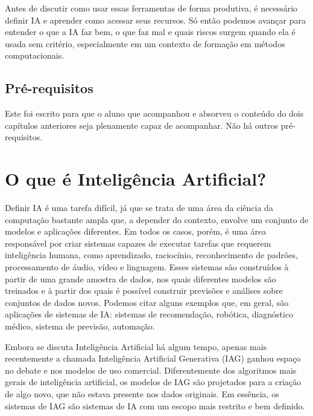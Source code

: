 \documentclass[
  brazilian,
  letterpaper,
  DIV=11,
  numbers=noendperiod]{scrreprt}
\begin{document}
Antes de discutir como usar essas ferramentas de forma produtiva, é
necessário definir IA e aprender como acessar seus recursos. Só então
podemos avançar para entender o que a IA faz bem, o que faz mal e quais
riscos surgem quando ela é usada sem critério, especialmente em um
contexto de formação em métodos computacionais.

\subsection{Pré-requisitos}\label{pruxe9-requisitos-2}

Este foi escrito para que o aluno que acompanhou e absorveu o conteúdo
do dois capítulos anteriores seja plenamente capaz de acompanhar. Não há
outros pré-requisitos.

\section{O que é Inteligência
Artificial?}\label{o-que-uxe9-inteliguxeancia-artificial}

Definir IA é uma tarefa difícil, já que se trata de uma área da ciência
da computação bastante ampla que, a depender do contexto, envolve um
conjunto de modelos e aplicações diferentes. Em todos os casos, porém, é
uma área responsável por criar sistemas capazes de executar tarefas que
requerem inteligência humana, como aprendizado, raciocínio,
reconhecimento de padrões, processamento de áudio, vídeo e linguagem.
Esses sistemas são construídos à partir de uma grande amostra de dados,
nos quais diferentes modelos são treinados e à partir dos quais é
possível construir previsões e análises sobre conjuntos de dados novos.
Podemos citar alguns exemplos que, em geral, são aplicações de sistemas
de IA: sistemas de recomendação, robótica, diagnóstico médico, sistema
de previsão, automação.

Embora se discuta Inteligência Artificial há algum tempo, apenas mais
recentemente a chamada Inteligência Artificial Generativa (IAG) ganhou
espaço no debate e nos modelos de uso comercial. Diferentemente dos
algoritmos mais gerais de inteligência artificial, os modelos de IAG são
projetados para a criação de algo novo, que não estava presente nos
dados originais. Em essência, os sistemas de IAG são sistemas de IA com
um escopo mais restrito e bem definido.
\end{document}
